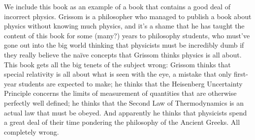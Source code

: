 \documentclass[10pt,a4paper]{book}
\theoremstyle{definition}
\begin{document}
We include this book as an example of a book that contains a good deal of incorrect physics.  Grissom is a philosopher who managed to publish a book about physics without knowing much physics, and it's a shame that he has taught the content of this book for some (many?) years to philosophy students, who must've gone out into the big world thinking that physicists must be incredibly dumb if they really believe the naïve concepts that Grissom thinks physics is all about.  This book gets all the big tenets of the subject wrong: Grissom thinks that special relativity is all about what is seen with the eye, a mistake that only first-year students are expected to make; he thinks that the Heisenberg Uncertainty Principle concerns the limits of measurement of quantities that are otherwise perfectly well defined; he thinks that the Second Law of Thermodynamics is an actual law that must be obeyed.  And apparently he thinks that physicists spend a great deal of their time pondering the philosophy of the Ancient Greeks.  All completely wrong.
\end{document}
